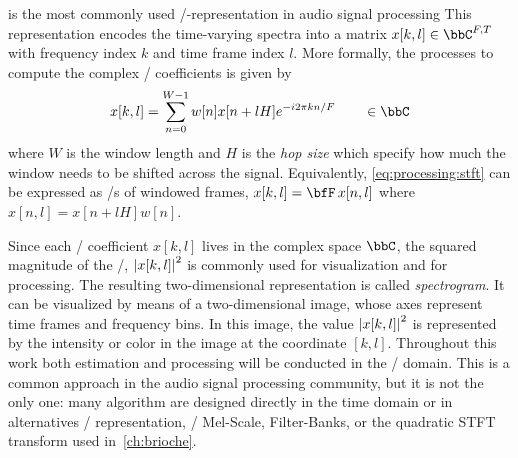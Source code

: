 is the most commonly used \TF/-representation in audio signal processing
This representation encodes the time-varying spectra into a matrix $x[k,l] \in \bbC^{F,T}$ with frequency index $k$ and time frame index $l$. More formally, the processes to compute the complex \STFT/ coefficients is given by
\begin{equation}\label{eq:processing:stft}
    x[k, l]  = \sum_{n=0}^{W-1} w[n] x[n + l H] \cste^{- \csti 2 \pi k n / F} \mathspace\in\bbC
\end{equation}
where $W$ is the window length and $H$ is the \textit{hop size} which specify how much the window needs to be shifted across the signal.
Equivalently, \cref{eq:processing:stft} can be expressed as \DFT/s of windowed frames, $x[k, l] = \discreteFT{x[n,l]}$ where $x[n,l] = x[n + l H] w[n]$.

Since each \STFT/ coefficient $x[k, l]$ lives in the complex space $\bbC$, the squared magnitude of the \STFT/, $\powerOf{x[k,l]}$ is
commonly used for visualization and for processing.
The resulting two-dimensional representation is called \textit{spectrogram}.
It can be visualized by means of a two-dimensional image, whose axes represent time frames and frequency bins.
In this image, the value $\powerOf{x[k,l]}$ is represented by the intensity or color in the image at the coordinate $[k,l]$.
Throughout this work both estimation and processing will be conducted in the \STFT/ domain.
This is a common approach in the audio signal processing community, but it is not the only one:
many algorithm are designed directly in the time domain or in alternatives \TF/ representation, \eg/ Mel-Scale, Filter-Banks, or the quadratic STFT transform used in~\cref{ch:brioche}.

